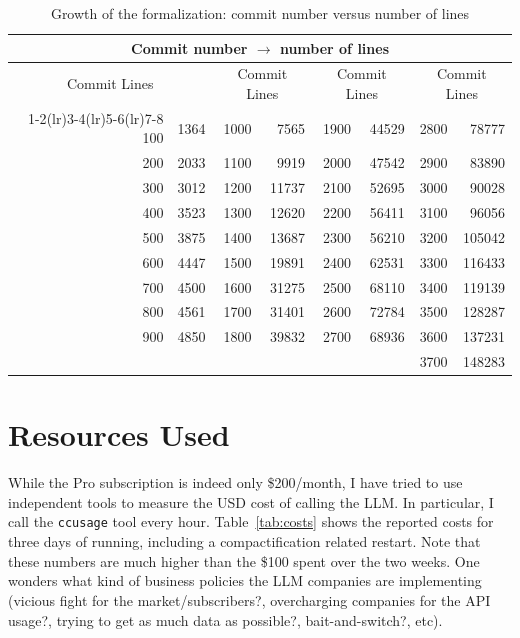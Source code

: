 \documentclass[a4paper,UKenglish,cleveref, autoref, thm-restate]{lipics-v2021}
\begin{document}
\begin{table}[h]
\centering
\small
\setlength{\tabcolsep}{6pt}
\begin{tabular}{rr|rr|rr|rr}
\toprule
\multicolumn{8}{c}{\textbf{Commit number $\rightarrow$ number of lines}} \\
\midrule
\multicolumn{2}{c}{Commit \quad Lines} &
\multicolumn{2}{c}{Commit \quad Lines} &
\multicolumn{2}{c}{Commit \quad Lines} &
\multicolumn{2}{c}{Commit \quad Lines} \\
\cmidrule(lr){1-2}\cmidrule(lr){3-4}\cmidrule(lr){5-6}\cmidrule(lr){7-8}
100  & 1364   & 1000 & 7565   & 1900 & 44529  & 2800 & 78777  \\
200  & 2033   & 1100 & 9919   & 2000 & 47542  & 2900 & 83890  \\
300  & 3012   & 1200 & 11737  & 2100 & 52695  & 3000 & 90028  \\
400  & 3523   & 1300 & 12620  & 2200 & 56411  & 3100 & 96056  \\
500  & 3875   & 1400 & 13687  & 2300 & 56210  & 3200 & 105042 \\
600  & 4447   & 1500 & 19891  & 2400 & 62531  & 3300 & 116433 \\
700  & 4500   & 1600 & 31275  & 2500 & 68110  & 3400 & 119139 \\
800  & 4561   & 1700 & 31401  & 2600 & 72784  & 3500 & 128287 \\
900  & 4850   & 1800 & 39832  & 2700 & 68936  & 3600 & 137231 \\
     &        &      &        &      &        & 3700 & 148283 \\
\bottomrule
\end{tabular}
\caption{Growth of the formalization: commit number versus number of lines\label{tab:lines} }
\end{table}


\section{Resources Used}
While the Pro subscription is indeed only \$200/month, I have tried to use
independent tools to measure the USD cost of calling the LLM. In particular, I
call the \texttt{ccusage} tool every hour. Table~\ref{tab:costs} shows the reported costs for
three days of running, including a compactification related restart. Note that
these numbers are much higher than the \$100 spent over the two weeks. One
wonders what kind of business policies the LLM companies are implementing
(vicious fight for the market/subscribers?, overcharging companies for the
API usage?, trying to get as much data as possible?, bait-and-switch?, etc).
\end{document}
